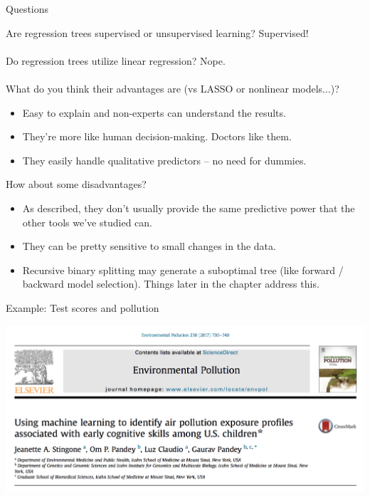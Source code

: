 \documentclass[mathserif, aspectratio=169]{beamer}
\begin{document}
\begin{frame}{Questions}

Are regression trees supervised or unsupervised learning? \pause  Supervised!\\~\\

\pause Do regression trees utilize linear regression? \pause Nope.  \\~\\

What do you think their advantages are (vs LASSO or nonlinear models...)? \pause

\begin{itemize}
\item Easy to explain and non-experts can understand the results.
\item They're more like human decision-making.  Doctors like them.
\item They easily handle qualitative predictors -- no need for dummies.
\end{itemize}

\pause How about some disadvantages? \pause

\begin{itemize}
\item As described, they don't usually provide the same predictive power that the other tools we've studied can.
\item They can be pretty sensitive to small changes in the data. 
\item Recursive binary splitting may generate a suboptimal tree (like forward / backward model selection).  Things later in the chapter address this.
\end{itemize}
\end{frame}


\begin{frame}{Example: Test scores and pollution}

\includegraphics[width=\textwidth]{stingone_etal}
\end{frame}
\end{document}
